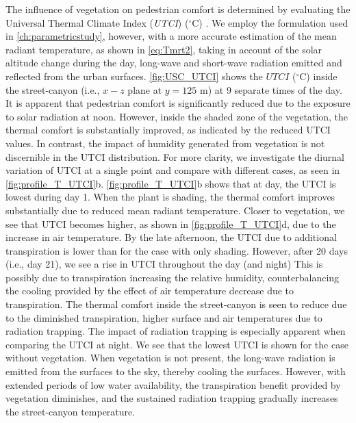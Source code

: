 The influence of vegetation on pedestrian comfort is determined by evaluating the Universal Thermal Climate Index (\textit{UTCI}) ($^{\circ}$C) \citep{Fiala2001,Manickathan2018a}. We employ the formulation used in \cref{ch:parametricstudy}, however, with a more accurate estimation of the mean radiant temperature, as shown in \cref{eq:Tmrt2}, taking in account of the solar altitude change during the day, long-wave and short-wave radiation emitted and reflected from the urban surfaces. \cref{fig:USC_UTCI} shows the $\textit{UTCI}$ ($^{\circ}$C) inside the street-canyon (i.e., $x-z$ plane at $y=125$ m) at 9 separate times of the day. It is apparent that pedestrian comfort is significantly reduced due to the exposure to solar radiation at noon. However, inside the shaded zone of the vegetation, the thermal comfort is substantially improved, as indicated by the reduced UTCI values. In contrast, the impact of humidity generated from vegetation is not discernible in the UTCI distribution. For more clarity, we investigate the diurnal variation of UTCI at a single point and compare with different cases, as seen in \cref{fig:profile_T_UTCI}b. \cref{fig:profile_T_UTCI}b shows that at day, the UTCI is lowest during day 1. When the plant is shading, the thermal comfort improves substantially due to reduced mean radiant temperature. Closer to vegetation, we see that UTCI becomes higher, as shown in \cref{fig:profile_T_UTCI}d, due to the increase in air temperature. By the late afternoon, the UTCI due to additional transpiration is lower than for the case with only shading. However, after 20 days (i.e., day 21), we see a rise in UTCI throughout the day (and night) This is possibly due to transpiration increasing the relative humidity, counterbalancing the cooling provided by the effect of air temperature decrease due to transpiration. The thermal comfort inside the street-canyon is seen to reduce due to the diminished transpiration, higher surface and air temperatures due to radiation trapping. The impact of radiation trapping is especially apparent when comparing the UTCI at night. We see that the lowest UTCI is shown for the case without vegetation. When vegetation is not present, the long-wave radiation is emitted from the surfaces to the sky, thereby cooling the surfaces. However, with extended periods of low water availability, the transpiration benefit provided by vegetation diminishes, and the sustained radiation trapping gradually increases the street-canyon temperature.






